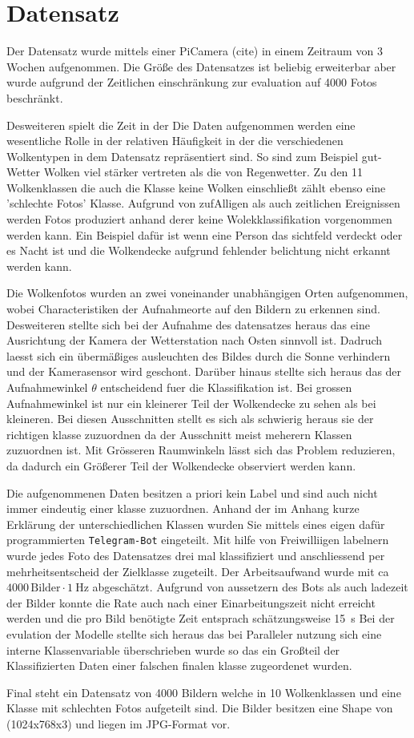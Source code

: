 \section{Datensatz}
\label{sec:02_Datensatz}

Der Datensatz wurde mittels einer PiCamera (cite) in einem Zeitraum von 3 Wochen
aufgenommen. 
Die Größe des Datensatzes ist beliebig erweiterbar aber wurde aufgrund der
Zeitlichen einschränkung zur evaluation auf \num{4000} Fotos beschränkt. 

Desweiteren spielt die Zeit in der Die Daten aufgenommen werden eine wesentliche
Rolle in der relativen Häufigkeit in der die verschiedenen Wolkentypen in dem
Datensatz repräsentiert sind. 
So sind zum Beispiel gut-Wetter Wolken viel stärker vertreten als die von
Regenwetter. 
Zu den 11 Wolkenklassen die auch die Klasse keine Wolken einschließt zählt
ebenso eine 'schlechte Fotos' Klasse. 
Aufgrund von zufAlligen als auch zeitlichen Ereignissen werden Fotos produziert
anhand derer keine Wolekklassifikation vorgenommen werden kann.
Ein Beispiel dafür ist wenn eine Person das sichtfeld verdeckt oder es Nacht ist
und die Wolkendecke aufgrund fehlender belichtung nicht erkannt werden kann. 

Die Wolkenfotos wurden an zwei voneinander unabhängigen Orten aufgenommen, wobei
Characteristiken der Aufnahmeorte auf den Bildern zu erkennen sind.
Desweiteren stellte sich bei der Aufnahme des datensatzes heraus das eine
Ausrichtung der Kamera der Wetterstation nach Osten sinnvoll ist.
Dadruch laesst sich ein übermäßiges ausleuchten des Bildes durch die Sonne
verhindern und der Kamerasensor wird geschont.
Darüber hinaus stellte sich heraus das der Aufnahmewinkel $\theta$ entscheidend
fuer die Klassifikation ist. 
Bei grossen Aufnahmewinkel ist nur ein kleinerer Teil der Wolkendecke zu sehen
als bei kleineren.
Bei diesen Ausschnitten stellt es sich als schwierig heraus sie der richtigen
klasse zuzuordnen da der Ausschnitt meist meherern Klassen zuzuordnen ist. 
Mit Grösseren Raumwinkeln lässt sich das Problem reduzieren, da dadurch ein
Größerer Teil der Wolkendecke observiert werden kann. 

Die aufgenommenen Daten besitzen a priori kein Label und sind auch nicht immer
eindeutig einer klasse zuzuordnen.
Anhand der im Anhang kurze Erklärung der unterschiedlichen Klassen wurden Sie
mittels eines eigen dafür programmierten \texttt{Telegram-Bot} eingeteilt.
Mit hilfe von Freiwilliigen labelnern wurde jedes Foto des Datensatzes drei mal
klassifiziert und anschliessend per mehrheitsentscheid der Zielklasse zugeteilt.
Der Arbeitsaufwand wurde mit ca $\num{4000} \, \text{Bilder} \cdot \SI{1}{\hertz}$
abgeschätzt.
Aufgrund von aussetzern des Bots als auch ladezeit der Bilder konnte die Rate
auch nach einer Einarbeitungszeit nicht erreicht werden und die pro Bild benötigte Zeit entsprach schätzungsweise
\SI{15}{\second}
Bei der evulation der Modelle stellte sich heraus das bei Paralleler nutzung
sich eine interne Klassenvariable überschrieben wurde so das ein Großteil der
Klassifizierten Daten einer falschen finalen klasse zugeordenet wurden. 

Final steht ein Datensatz von \num{4000} Bildern welche in 10 Wolkenklassen und
eine Klasse mit schlechten Fotos aufgeteilt sind. Die Bilder besitzen eine Shape
von (1024x768x3) und liegen im JPG-Format vor.
